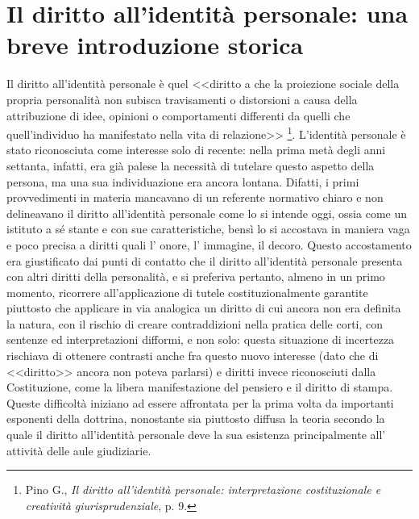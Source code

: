 \section{Il diritto all'identità personale: una breve introduzione storica}
Il diritto all'identità personale è quel <<diritto a che la proiezione sociale della propria personalità non subisca travisamenti
o distorsioni a causa della attribuzione di idee, opinioni o comportamenti differenti da quelli che quell’individuo ha manifestato nella vita di relazione>>
\footnote{Pino G.,\textit{ Il diritto all'identità personale: interpretazione costituzionale e creatività giurisprudenziale}, p. 9.}.
L'identità personale è stato riconosciuta come interesse solo di recente: nella prima metà degli anni settanta, infatti, era già palese la necessità di tutelare questo aspetto della persona, ma una sua individuazione era ancora lontana. Difatti, i primi provvedimenti in materia mancavano di un referente normativo chiaro e non delineavano il diritto all’identità personale come lo si intende oggi, ossia come un istituto a sé stante e con sue caratteristiche, bensì lo si accostava in maniera vaga e poco precisa a diritti quali l' onore, l' immagine, il decoro.
Questo accostamento era giustificato dai punti di contatto che il diritto all'identità personale presenta con altri diritti della personalità, e si preferiva pertanto, almeno in un primo momento, ricorrere all'applicazione di tutele costituzionalmente garantite piuttosto che applicare in via analogica un diritto di cui ancora non era definita la natura, con il rischio di creare contraddizioni nella pratica delle corti, con sentenze ed interpretazioni difformi, e non solo: questa situazione di incertezza rischiava di ottenere contrasti anche fra questo nuovo interesse (dato che di <<diritto>> ancora non poteva parlarsi) e diritti invece riconosciuti dalla Costituzione, come la libera manifestazione del pensiero e il diritto di stampa. 
Queste difficoltà iniziano ad essere affrontata per la prima volta da importanti esponenti della dottrina, nonostante sia piuttosto diffusa la teoria secondo la quale il diritto all'identità personale deve la sua esistenza principalmente all' attività delle aule giudiziarie. 
